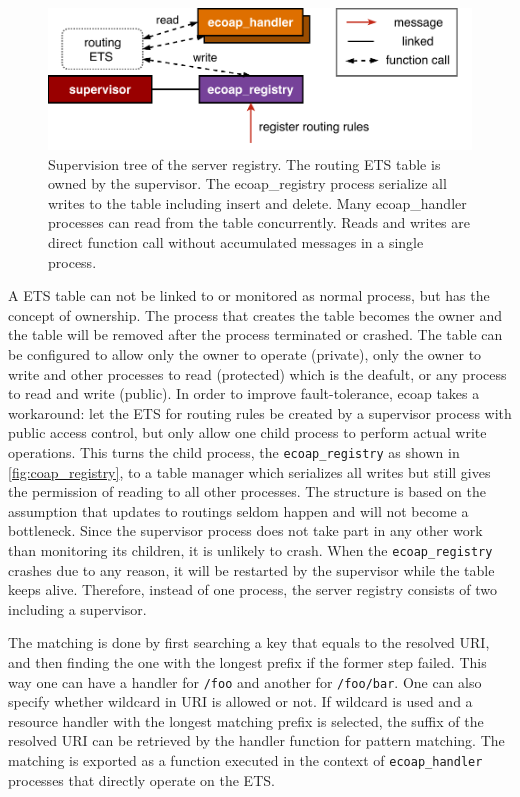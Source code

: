 \begin{figure}[!htbp]
\centering
\includegraphics[scale = 0.7]{coap_registry}
\caption[Supervision tree of the server registry]{Supervision tree of the server registry. The routing ETS table is owned by the supervisor. The ecoap\_registry process serialize all writes to the table including insert and delete. Many ecoap\_handler processes can read from the table concurrently. Reads and writes are direct function call without accumulated messages in a single process.}
\label{fig:coap_registry}
\end{figure}
 
A ETS table can not be linked to or monitored as normal process, but has the concept of ownership. The process that creates the table becomes the owner and the table will be removed after the process terminated or crashed. The table can be configured to allow only the owner to operate (private), only the owner to write and other processes to read (protected) which is the deafult, or any process to read and write (public). In order to improve fault-tolerance, ecoap takes a workaround: let the ETS for routing rules be created by a supervisor process with public access control, but only allow one child process to perform actual write operations. This turns the child process, the \verb|ecoap_registry| as shown in \autoref{fig:coap_registry}, to a table manager which serializes all writes but still gives the permission of reading to all other processes. The structure is based on the assumption that updates to routings seldom happen and will not become a bottleneck. Since the supervisor process does not take part in any other work than monitoring its children, it is unlikely to crash. When the \verb|ecoap_registry| crashes due to any reason, it will be restarted by the supervisor while the table keeps alive. Therefore, instead of one process, the server registry consists of two including a supervisor. 

The matching is done by first searching a key that equals to the resolved URI, and then finding the one with the longest prefix if the former step failed. This way one can have a handler for \verb|/foo| and another for \verb|/foo/bar|. One can also specify whether wildcard in URI is allowed or not. If wildcard is used and a resource handler with the longest matching prefix is selected, the suffix of the resolved URI can be retrieved by the handler function for pattern matching. The matching is exported as a function executed in the context of \verb|ecoap_handler| processes that directly operate on the ETS. 

